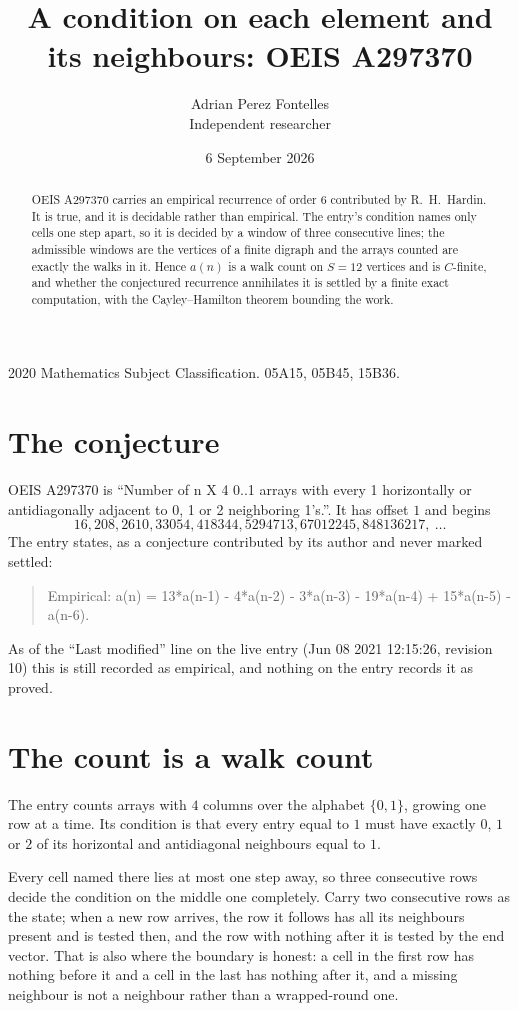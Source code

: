 \documentclass[11pt,a4paper]{article}
\title{A condition on each element and its neighbours: OEIS A297370}
\author{Adrian Perez Fontelles\\ \small Independent researcher}
\date{6 September 2026}
\theoremstyle{plain}
\theoremstyle{definition}
\begin{document}
\maketitle

\begin{abstract}
OEIS A297370 carries an empirical recurrence of order $6$ contributed by R.~H.~Hardin. It is
true, and it is decidable rather than empirical. The entry's condition names only cells one step apart, so it is decided by a window of
three consecutive lines; the
admissible windows are the vertices of a finite digraph and the arrays counted are exactly the
walks in it. Hence $a(n)$ is a walk count on $S=12$ vertices and is $C$-finite, and whether the
conjectured recurrence annihilates it is settled by a finite exact computation, with the
Cayley--Hamilton theorem bounding the work.
\end{abstract}

\noindent\small 2020 Mathematics Subject Classification. 05A15, 05B45, 15B36.\normalsize

\section{The conjecture}

OEIS A297370 is ``Number of n X 4 0..1 arrays with every 1 horizontally or antidiagonally adjacent to 0, 1 or 2 neighboring 1's.''. It has offset $1$ and begins
\[
16, 208, 2610, 33054, 418344, 5294713, 67012245, 848136217,\ \dots
\]
The entry states, as a conjecture contributed by its author and never marked settled:
\begin{quote}
Empirical: a(n) = 13*a(n-1) - 4*a(n-2) - 3*a(n-3) - 19*a(n-4) + 15*a(n-5) - a(n-6).
\end{quote}
As of the ``Last modified'' line on the live entry (Jun 08 2021 12:15:26, revision 10) this is still
recorded as empirical, and nothing on the entry records it as proved.

\section{The count is a walk count}

The entry counts arrays with $4$ columns over the alphabet $\{0,1\}$, growing one row at a time. Its condition is that every entry equal to $1$ must have exactly $0$, $1$ or $2$ of its horizontal and antidiagonal neighbours equal to $1$.

Every cell named there lies at most one step away, so three consecutive rows decide the condition on the middle one completely. Carry two consecutive rows as the state; when a new row arrives, the row it follows has all its neighbours present and is tested then, and the row with nothing after it is tested by the end vector. That is also where the boundary is honest: a cell in the first row has nothing before it and a cell in the last has nothing after it, and a missing neighbour is not a neighbour rather than a wrapped-round one.
\end{document}
